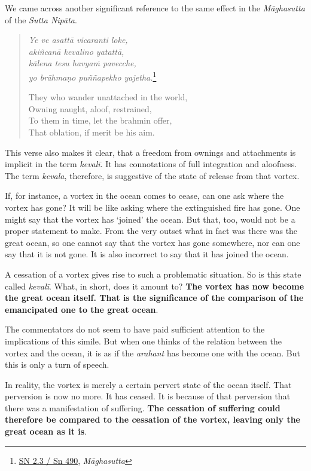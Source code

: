 We came across another significant reference to the same effect in the \emph{Māghasutta} of the \emph{Sutta Nipāta}.

\begin{quote}
\emph{Ye ve asattā vicaranti loke,}\\
\emph{akiñcanā kevalino yatattā,}\\
\emph{kālena tesu havyaṁ pavecche,}\\
\emph{yo brāhmaṇo puññapekho yajetha.}\footnote{\href{https://suttacentral.net/sn2.3/pli/ms}{SN 2.3 / Sn 490}, \emph{Māghasutta}}

They who wander unattached in the world,\\
Owning naught, aloof, restrained,\\
To them in time, let the brahmin offer,\\
That oblation, if merit be his aim.
\end{quote}

This verse also makes it clear, that a freedom from ownings and attachments is implicit in the term \emph{kevalī}. It has connotations of full integration and aloofness. The term \emph{kevala}, therefore, is suggestive of the state of release from that vortex.

If, for instance, a vortex in the ocean comes to cease, can one ask where the vortex has gone? It will be like asking where the extinguished fire has gone. One might say that the vortex has `joined' the ocean. But that, too, would not be a proper statement to make. From the very outset what in fact was there was the great ocean, so one cannot say that the vortex has gone somewhere, nor can one say that it is not gone. It is also incorrect to say that it has joined the ocean.

A cessation of a vortex gives rise to such a problematic situation. So is this state called \emph{kevalī}. What, in short, does it amount to? \textbf{The vortex has now become the great ocean itself. That is the significance of the comparison of the emancipated one to the great ocean}.

The commentators do not seem to have paid sufficient attention to the implications of this simile. But when one thinks of the relation between the vortex and the ocean, it is as if the \emph{arahant} has become one with the ocean. But this is only a turn of speech.

In reality, the vortex is merely a certain pervert state of the ocean itself. That perversion is now no more. It has ceased. It is because of that perversion that there was a manifestation of suffering. \textbf{The cessation of suffering could therefore be compared to the cessation of the vortex, leaving only the great ocean as it is}.

